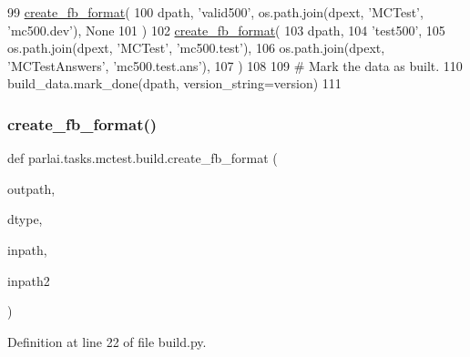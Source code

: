 \begin{DoxyCode}
99         \hyperlink{namespaceparlai_1_1tasks_1_1wikiqa_1_1build_a554828702769592403db58c955d1dfe3}{create\_fb\_format}(
100             dpath, \textcolor{stringliteral}{'valid500'}, os.path.join(dpext, \textcolor{stringliteral}{'MCTest'}, \textcolor{stringliteral}{'mc500.dev'}), \textcolor{keywordtype}{None}
101         )
102         \hyperlink{namespaceparlai_1_1tasks_1_1wikiqa_1_1build_a554828702769592403db58c955d1dfe3}{create\_fb\_format}(
103             dpath,
104             \textcolor{stringliteral}{'test500'},
105             os.path.join(dpext, \textcolor{stringliteral}{'MCTest'}, \textcolor{stringliteral}{'mc500.test'}),
106             os.path.join(dpext, \textcolor{stringliteral}{'MCTestAnswers'}, \textcolor{stringliteral}{'mc500.test.ans'}),
107         )
108 
109         \textcolor{comment}{# Mark the data as built.}
110         build\_data.mark\_done(dpath, version\_string=version)
111 \end{DoxyCode}
\mbox{\label{namespaceparlai_1_1tasks_1_1mctest_1_1build_a7d827f19f83b7d60f4ed1dbabade06cf}} 
\subsubsection{\texorpdfstring{create\+\_\+fb\+\_\+format()}{create\_fb\_format()}}
{\footnotesize\ttfamily def parlai.\+tasks.\+mctest.\+build.\+create\+\_\+fb\+\_\+format (\begin{DoxyParamCaption}\item[{}]{outpath,  }\item[{}]{dtype,  }\item[{}]{inpath,  }\item[{}]{inpath2 }\end{DoxyParamCaption})}



Definition at line 22 of file build.\+py.


